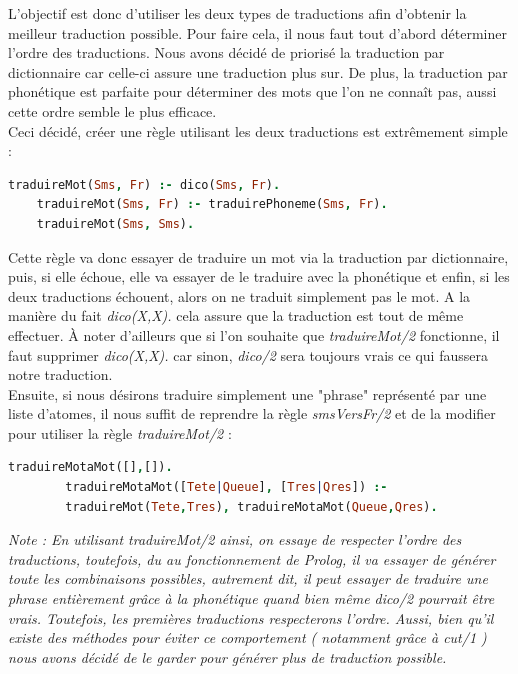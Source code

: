 \documentclass[11pt]{book}
\begin{document}
	L'objectif est donc d'utiliser les deux types de traductions afin d'obtenir la meilleur traduction possible. Pour faire cela, il nous faut tout d'abord déterminer l'ordre des traductions. Nous avons décidé de priorisé la traduction par dictionnaire car celle-ci assure une traduction plus sur. De plus, la traduction par phonétique est parfaite pour déterminer des mots que l'on ne connaît pas, aussi cette ordre semble le plus efficace.\\
	Ceci décidé, créer une règle utilisant les deux traductions est extrêmement simple :
	\begin{lstlisting}[language=Prolog]
	traduireMot(Sms, Fr) :- dico(Sms, Fr).
	traduireMot(Sms, Fr) :- traduirePhoneme(Sms, Fr).
	traduireMot(Sms, Sms).
	\end{lstlisting}
	
	Cette règle va donc essayer de traduire un mot via la traduction par dictionnaire, puis, si elle échoue, elle va essayer de le traduire avec la phonétique et enfin, si les deux traductions échouent, alors on ne traduit simplement pas le mot. A la manière du fait {\em dico(X,X).} cela assure que la traduction est tout de même effectuer. À noter d'ailleurs que si l'on souhaite que {\em traduireMot/2} fonctionne, il faut supprimer {\em dico(X,X).} car sinon, {\em dico/2} sera toujours vrais ce qui faussera notre traduction.\\
	
	Ensuite, si nous désirons traduire simplement une "phrase" représenté par une liste d'atomes, il nous suffit de reprendre la règle {\em smsVersFr/2} et de la modifier pour utiliser la règle {\em traduireMot/2} :
	\begin{lstlisting}[language=Prolog]
	traduireMotaMot([],[]).
		traduireMotaMot([Tete|Queue], [Tres|Qres]) :-
		traduireMot(Tete,Tres), traduireMotaMot(Queue,Qres).
	\end{lstlisting}
	
	{\em Note : En utilisant traduireMot/2 ainsi, on essaye de respecter l'ordre des traductions, toutefois, du au fonctionnement de Prolog, il va essayer de générer toute les combinaisons possibles, autrement dit, il peut essayer de traduire une phrase entièrement grâce à la phonétique quand bien même dico/2 pourrait être vrais. Toutefois, les premières traductions respecterons l'ordre. Aussi, bien qu'il existe des méthodes pour éviter ce comportement ( notamment grâce à cut/1 ) nous avons décidé de le garder pour générer plus de traduction possible.}\\
	
\end{document}
